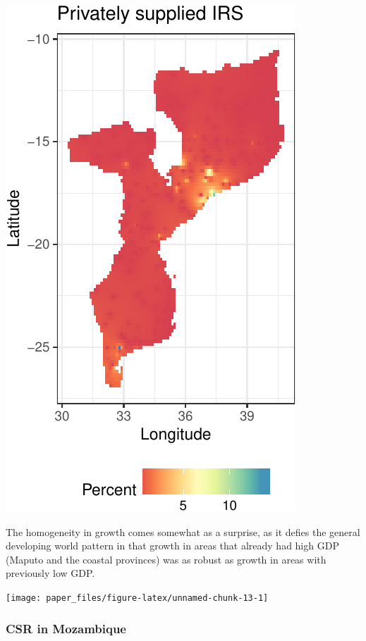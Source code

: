 \documentclass[]{elsarticle} %
\begin{document}
\begin{center}\includegraphics{paper_files/figure-latex/unnamed-chunk-12-1} \end{center}

The homogeneity in growth comes somewhat as a surprise, as it defies the
general developing world pattern in that growth in areas that already
had high GDP (Maputo and the coastal provinces) was as robust as growth
in areas with previously low GDP.

\begin{center}\texttt{[image: paper\_files/figure-latex/unnamed-chunk-13-1]} \end{center}

\subsubsection{CSR in Mozambique}\label{csr-in-mozambique}
\end{document}
